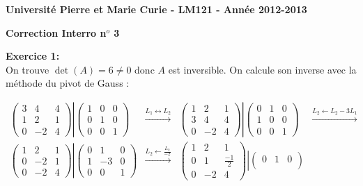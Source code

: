 \documentclass[a4paper, 10pt]{article}
\theoremstyle{plain}
\begin{document}
\noindent
\large
\textbf{Universit\'e Pierre et Marie Curie 
 - LM121 -
Ann\'ee 2012-2013}\\

\begin{center}
\Large
\textbf{Correction Interro n$^o$ 3}
\end{center}
\normalsize

\medskip
\noindent
\textbf{Exercice 1:}\\
On trouve 
$\det(A) = 6 \neq 0$ donc $A$ est inversible. On calcule son inverse avec la méthode du pivot de Gauss : 

\begin{align*}
\begin{pmatrix}
 3 & 4 & 4 \\
1 & 2 & 1 \\
0 & -2 & 4 
\end{pmatrix}
\left| 
\begin{pmatrix} 
 1 & 0 & 0 \\
0 & 1 & 0 \\
 0 & 0 & 1 
\end{pmatrix}
\right. 
&
\xrightarrow[]{L_1 \leftrightarrow L_2 }
&
\begin{pmatrix}
 1 & 2 & 1 \\
3 & 4 & 4 \\
0 & -2 & 4 
\end{pmatrix}
\left| 
\begin{pmatrix} 
 0 & 1 & 0 \\
1 & 0 & 0 \\
 0 & 0 & 1 
\end{pmatrix}
\right. 
&
\xrightarrow[]{L_2 \leftarrow L_2-3L_1 } \\
\begin{pmatrix}
 1 & 2 & 1 \\
0 & -2 & 1 \\
0 & -2 & 4 
\end{pmatrix}
\left| 
\begin{pmatrix} 
 0 & 1 & 0 \\
1 & -3 & 0 \\
 0 & 0 & 1 
\end{pmatrix}
\right. 
&
\xrightarrow[]{L_2 \leftarrow \frac{L_2}{-2} }
&
\begin{pmatrix}
 1 & 2 & 1 \\
0 & 1 & \frac{-1}{2} \\
0 & -2 & 4 
\end{pmatrix}
\left| 
\begin{pmatrix} 
 0 & 1 & 0 \\

\end{pmatrix}
\end{align*}
\end{document}
